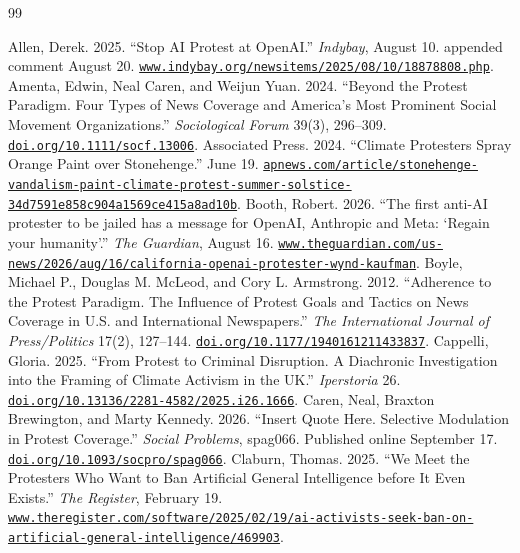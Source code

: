 \documentclass[11pt]{article}
\begin{document}
\begin{thebibliography}{99}
\setlength{\itemsep}{0.25em}

 Allen, Derek. 2025. ``Stop AI Protest at OpenAI.'' \emph{Indybay}, August 10. appended comment August 20. \href{https://www.indybay.org/newsitems/2025/08/10/18878808.php}{\nolinkurl{www.indybay.org/newsitems/2025/08/10/18878808.php}}.
 Amenta, Edwin, Neal Caren, and Weijun Yuan. 2024. ``Beyond the Protest Paradigm.  Four Types of News Coverage and America's Most Prominent Social Movement Organizations.'' \emph{Sociological Forum} 39(3), 296--309. \href{https://doi.org/10.1111/socf.13006}{\nolinkurl{doi.org/10.1111/socf.13006}}.
 Associated Press. 2024. ``Climate Protesters Spray Orange Paint over Stonehenge.'' June 19. \href{https://apnews.com/article/stonehenge-vandalism-paint-climate-protest-summer-solstice-34d7591e858c904a1569ce415a8ad10b}{\nolinkurl{apnews.com/article/stonehenge-vandalism-paint-climate-protest-summer-solstice-34d7591e858c904a1569ce415a8ad10b}}.
 Booth, Robert. 2026. ``The first anti-AI protester to be jailed has a message for OpenAI, Anthropic and Meta: `Regain your humanity'.'' \emph{The Guardian}, August 16. \href{https://www.theguardian.com/us-news/2026/aug/16/california-openai-protester-wynd-kaufman}{\nolinkurl{www.theguardian.com/us-news/2026/aug/16/california-openai-protester-wynd-kaufman}}.
 Boyle, Michael P., Douglas M. McLeod, and Cory L. Armstrong. 2012. ``Adherence to the Protest Paradigm.  The Influence of Protest Goals and Tactics on News Coverage in U.S. and International Newspapers.'' \emph{The International Journal of Press/Politics} 17(2), 127--144. \href{https://doi.org/10.1177/1940161211433837}{\nolinkurl{doi.org/10.1177/1940161211433837}}.
 Cappelli, Gloria. 2025. ``From Protest to Criminal Disruption.  A Diachronic Investigation into the Framing of Climate Activism in the UK.'' \emph{Iperstoria} 26. \href{https://doi.org/10.13136/2281-4582/2025.i26.1666}{\nolinkurl{doi.org/10.13136/2281-4582/2025.i26.1666}}.
 Caren, Neal, Braxton Brewington, and Marty Kennedy. 2026. ``Insert Quote Here.  Selective Modulation in Protest Coverage.'' \emph{Social Problems}, spag066. Published online September 17. \href{https://doi.org/10.1093/socpro/spag066}{\nolinkurl{doi.org/10.1093/socpro/spag066}}.
 Claburn, Thomas. 2025. ``We Meet the Protesters Who Want to Ban Artificial General Intelligence before It Even Exists.'' \emph{The Register}, February 19. \href{https://www.theregister.com/software/2025/02/19/ai-activists-seek-ban-on-artificial-general-intelligence/469903}{\nolinkurl{www.theregister.com/software/2025/02/19/ai-activists-seek-ban-on-artificial-general-intelligence/469903}}.

\end{thebibliography}
\end{document}
